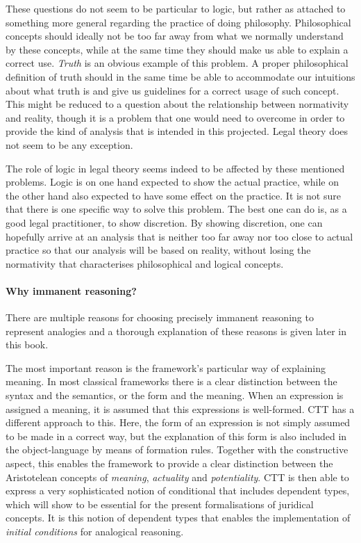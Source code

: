 			These questions do not seem to be particular to logic, but rather as attached to something more general regarding the practice of doing philosophy. Philosophical concepts should ideally not be too far away from what we normally understand by these concepts, while at the same time they should make us able to explain a correct use. \textit{Truth} is an obvious example of this problem. A proper philosophical definition of truth should in the same time be able to accommodate our intuitions about what truth is and give us guidelines for a correct usage of such concept. This might be reduced to a question about the relationship between normativity and reality, though it is a problem that one would need to overcome in order to provide the kind of analysis that is intended in this projected. Legal theory does not seem to be any exception. 
			
			The role of logic in legal theory seems indeed to be affected by these mentioned problems. Logic is on one hand expected to show the actual practice, while on the other hand also expected to have some effect on the practice. It is not sure that there is one specific way to solve this problem. The best one can do is, as a good legal practitioner, to show discretion. By showing discretion, one can hopefully arrive at an analysis that is neither too far away nor too close to actual practice so that our analysis will be based on reality, without losing the normativity that characterises philosophical and logical concepts. 
		
		\paragraph{Why immanent reasoning?}
		
			There are multiple reasons for choosing precisely immanent reasoning to represent analogies and a thorough explanation of these reasons is given later in this book. 
			
			The most important reason is the framework's particular way of explaining meaning. In most classical frameworks there is a clear distinction between the syntax and the semantics, or the form and the meaning. When an expression is assigned a meaning, it is assumed that this expressions is well-formed. CTT has a different approach to this. Here, the form of an expression is not simply assumed to be made in a correct way, but the explanation of this form is also included in the object-language by means of formation rules. Together with the constructive aspect, this enables the framework to provide a clear distinction between the Aristotelean concepts of \textit{meaning}, \textit{actuality} and \textit{potentiality}. CTT is then able to express a very sophisticated notion of conditional that includes dependent types, which will show to be essential for the present formalisations of juridical concepts. It is this notion of dependent types that enables the implementation of \textit{initial conditions} for analogical reasoning. 
			
